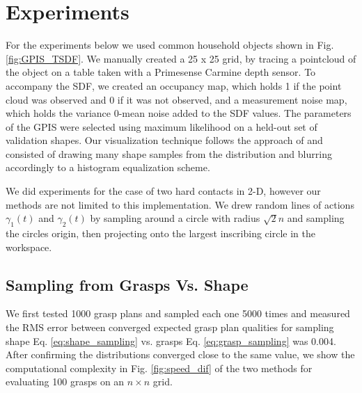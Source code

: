 \documentclass[letterpaper, 10 pt, conference]{ieeeconf}  %
\begin{document}
\section{Experiments}
For the experiments below we used common household objects shown in Fig. \ref{fig:GPIS_TSDF}. We manually created a 25 x 25 grid, by tracing a pointcloud of the object on a table taken with a Primesense Carmine depth sensor. To accompany the SDF, we created an occupancy map, which holds 1 if the point cloud was observed and 0 if it was not observed, and a measurement noise map, which holds the variance 0-mean noise added to the SDF values. The parameters of the GPIS were selected using maximum likelihood on a held-out set of validation shapes. Our visualization technique follows the approach of \cite{jeffs} and consisted of drawing many shape samples from the distribution and blurring accordingly to a histogram equalization scheme. 

We did experiments for the case of two hard contacts in 2-D, however our methods are not limited to this implementation. We drew random lines of actions $\gamma_1(t)$ and $\gamma_2(t)$ by sampling around a circle with radius $\sqrt{2}n$ and sampling the circles origin, then projecting onto the largest inscribing circle in the workspace. 


\subsection{Sampling from Grasps Vs. Shape}
We first tested 1000 grasp plans and sampled each one 5000 times  and measured the RMS error between converged expected grasp plan qualities for sampling shape Eq. \ref{eq:shape_sampling} vs. grasps  Eq. \ref{eq:grasp_sampling} was 0.004. After confirming the distributions converged close to the same value, we show the computational complexity in Fig. \ref{fig:speed_dif} of the two methods for evaluating 100 grasps on an $n \times n$ grid. 
\end{document}
